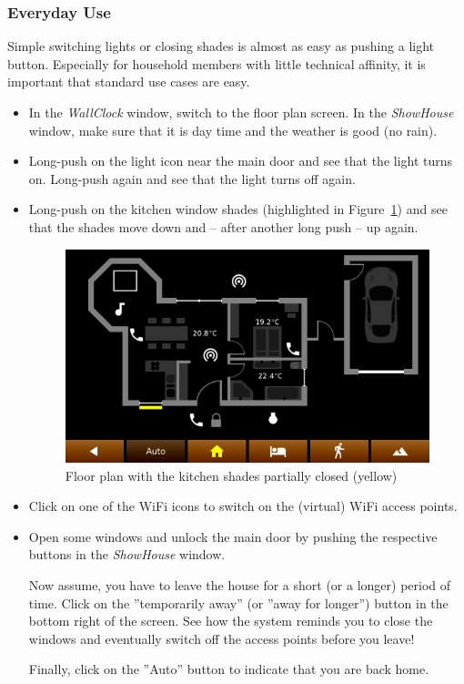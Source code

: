 \documentclass[12pt,english,parskip=half,headheight=19pt]{scrreprt}
\begin{document}
\subsubsection{Everyday Use}

Simple switching lights or closing shades is almost as easy as pushing a light button.
Especially for household members with little technical affinity, it is important that standard use cases are easy.

\begin{itemize}[$\blacktriangleright$]

  \item
    In the \textit{WallClock} window, switch to the floor plan screen. In the \textit{ShowHouse} window,
    make sure that it is day time and the weather is good (no rain).

  \item
    Long-push on the light icon near the main door and see that the light turns on.
    Long-push again and see that the light turns off again.

  \item
    Long-push on the kitchen window shades (highlighted in Figure~\ref{fig:tutorial-floorplan-shades}) and
    see that the shades move down and -- after another long push -- up again.

    \begin{figure}[ht]
      \centering
      \includegraphics[width=0.65\linewidth]{figs/wallclock-floorplan-shades.png}
      \caption[l]{Floor plan with the kitchen shades partially closed (yellow)}
      \label{fig:tutorial-floorplan-shades}
    \end{figure}

  \item
    Click on one of the WiFi icons to switch on the (virtual) WiFi access points.

  \item
    Open some windows and unlock the main door by pushing the respective buttons in the
    \textit{ShowHouse} window.

    Now assume, you have to leave the house for a short (or a longer) period of time.
    Click on the ''temporarily away'' (or ''away for longer'') button in the bottom right
    of the screen. See how the system reminds you to close the windows and eventually
    switch off the access points before you leave!

    Finally, click on the ''Auto'' button to indicate that you are back home.

\end{itemize}
\end{document}
